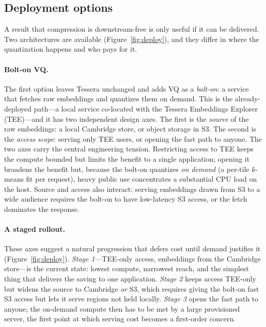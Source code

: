 \documentclass[11pt]{article}
\begin{document}
\subsection*{Deployment options}
\label{sec:deploy}

A result that compression is downstream-free is only useful if it can be
delivered. Two architectures are available (Figure~\ref{fig:deploy}), and they
differ in where the quantization happens and who pays for it.

\paragraph{Bolt-on VQ.}
The first option leaves Tessera unchanged and adds VQ as a \emph{bolt-on}: a
service that fetches raw embeddings and quantizes them on demand. This is the
already-deployed path---a local service co-located with the Tessera Embeddings
Explorer (TEE)---and it has two independent design axes. The first is the
\emph{source} of the raw embeddings: a local Cambridge store, or object storage
in S3. The second is the \emph{access scope}: serving only TEE users, or opening
the fast path to anyone. The two axes carry the central engineering tension.
Restricting access to TEE keeps the compute bounded but limits the benefit to a
single application; opening it broadens the benefit but, because the bolt-on
quantizes \emph{on demand} (a per-tile $k$-means fit per request), heavy public
use concentrates a substantial CPU load on the host. Source and access also
interact: serving embeddings drawn from S3 to a wide audience requires the
bolt-on to have low-latency S3 access, or the fetch dominates the response.

\paragraph{A staged rollout.}
These axes suggest a natural progression that defers cost until demand justifies
it (Figure~\ref{fig:deploy}). \emph{Stage 1}---TEE-only access, embeddings from
the Cambridge store---is the current state: lowest compute, narrowest reach, and
the simplest thing that delivers the saving to one application. \emph{Stage 2}
keeps access TEE-only but widens the source to Cambridge \emph{or} S3, which
requires giving the bolt-on fast S3 access but lets it serve regions not held
locally. \emph{Stage 3} opens the fast path to anyone; the on-demand compute then
has to be met by a large provisioned server, the first point at which serving
cost becomes a first-order concern.
\end{document}
